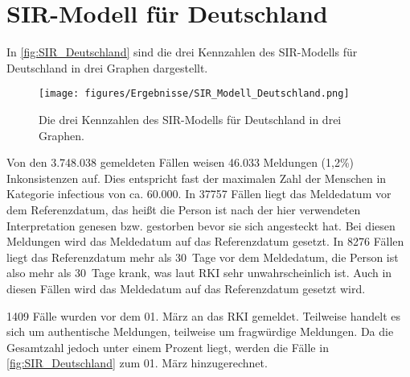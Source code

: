 \section{SIR-Modell für Deutschland}\label{sec:Resultate-SIR}
In \autoref{fig:SIR_Deutschland} sind die drei Kennzahlen des SIR-Modells für Deutschland in drei Graphen dargestellt.
\begin{figure}[H]
    \centering
    \texttt{[image: figures/Ergebnisse/SIR\_Modell\_Deutschland.png]}
    \caption{Die drei Kennzahlen des SIR-Modells für Deutschland in drei Graphen.}
    \label{fig:SIR_Deutschland}
\end{figure}

Von den 3.748.038 gemeldeten Fällen weisen 46.033 Meldungen (1,2\%) Inkonsistenzen auf. Dies entspricht fast der maximalen Zahl der Menschen in Kategorie \glqq{}infectious\grqq{} von ca. 60.000.
In 37757 Fällen liegt das Meldedatum vor dem Referenzdatum, das heißt die Person ist nach der hier verwendeten Interpretation genesen bzw. gestorben bevor sie sich angesteckt hat. Bei diesen Meldungen wird das Meldedatum auf das Referenzdatum gesetzt.
In 8276 Fällen liegt das Referenzdatum mehr als 30~Tage vor dem Meldedatum, die Person ist also mehr als 30~Tage krank, was laut RKI sehr unwahrscheinlich ist.\autocite{RKI_Bulletin} Auch in diesen Fällen wird das Meldedatum auf das Referenzdatum gesetzt wird.

1409 Fälle wurden vor dem 01. März an das RKI gemeldet. Teilweise handelt es sich um authentische Meldungen, teilweise um fragwürdige Meldungen. Da die Gesamtzahl jedoch unter einem Prozent liegt, werden die Fälle in \autoref{fig:SIR_Deutschland} zum 01. März hinzugerechnet.